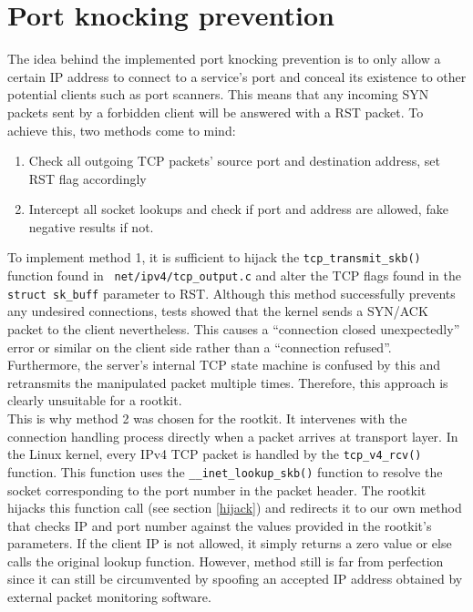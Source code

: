 \section{Port knocking prevention}
The idea behind the implemented port knocking prevention is to only allow a 
certain IP address to connect to a service's port and conceal its existence to 
other potential clients such as port scanners. 
This means that any incoming SYN packets sent by a forbidden client will be 
answered with a RST packet. To achieve this,
two methods come to mind:
\begin{enumerate}
 \item Check all outgoing TCP packets' source port and destination address, set 
RST flag accordingly
 \item Intercept all socket lookups and check if port and address are allowed, 
fake negative results if not.
\end{enumerate}
To implement method 1, it is sufficient to hijack the 
\verb+tcp_transmit_skb()+ function found in ~\texttt{net/ipv4/tcp\_output.c} 
and alter the TCP flags found in the \verb+struct sk_buff+
parameter to RST. Although this method successfully prevents any undesired 
connections, tests showed that the kernel sends a SYN/ACK
packet to the client nevertheless. This causes a ``connection closed 
unexpectedly'' error or similar on the client side rather than a
``connection refused''. Furthermore, the server's internal TCP state machine is 
confused by this and retransmits the manipulated packet
multiple times. Therefore, this approach is clearly unsuitable for a rootkit. 
\\
This is why method 2 was chosen for the rootkit. It intervenes with the 
connection handling process directly when a packet arrives at transport layer.
In the Linux kernel, every IPv4 TCP packet is handled by the 
\texttt{tcp\_v4\_rcv()} function. This 
function uses the \texttt{\_\_inet\_lookup\_skb()} function to resolve the 
socket 
corresponding to the port number in the packet header. The rootkit hijacks this 
function call (see section \ref{hijack}) and
redirects it to our own method that checks IP and port number against the values 
provided in the rootkit's parameters. If the client IP
is not allowed, it simply returns a zero value or else calls the original 
lookup 
function.
However, method still is far from perfection since it can still be circumvented 
by spoofing an accepted IP address obtained by external packet monitoring 
software.
